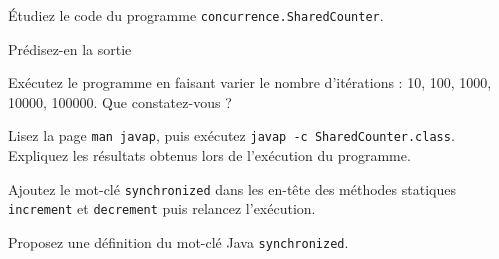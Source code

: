 
\begingroup

\begin{exercice}

  Étudiez le code du programme \texttt{concurrence.SharedCounter}.

  \begin{questions} 
  \item Prédisez-en la sortie
  \item Exécutez le programme en faisant varier le nombre d'itérations :
    10, 100, 1000, 10000, 100000. Que constatez-vous ?
  \item Lisez la page \texttt{man javap}, puis exécutez
    \texttt{javap -c SharedCounter.class}. Expliquez les résultats
    obtenus lors de l'exécution du programme.
  \item Ajoutez le mot-clé \lstinline{synchronized} dans les en-tête des méthodes statiques \lstinline{increment} et \lstinline{decrement} puis relancez l'exécution.
  \item Proposez une définition du mot-clé Java \lstinline{synchronized}.
  \end{questions}

\end{exercice}

\endgroup
\endinput
